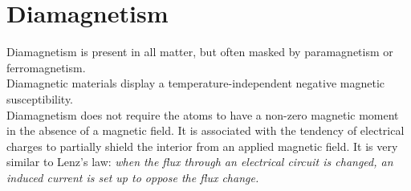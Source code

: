 \documentclass[a4paper, 11pt, normalem]{report}
\begin{document}
\chapter{Diamagnetism}
Diamagnetism is present in all matter, but often masked by paramagnetism or ferromagnetism. \\
Diamagnetic materials display a temperature-independent negative magnetic susceptibility. \\
Diamagnetism does not require the atoms to have a non-zero magnetic moment in the absence of a magnetic field. 
It is associated with the tendency of electrical charges to partially shield the interior from an applied magnetic field. 
It is very similar to Lenz's law: \emph{when the flux through an electrical circuit is changed, an induced current is set up to oppose the flux change.}
\end{document}
